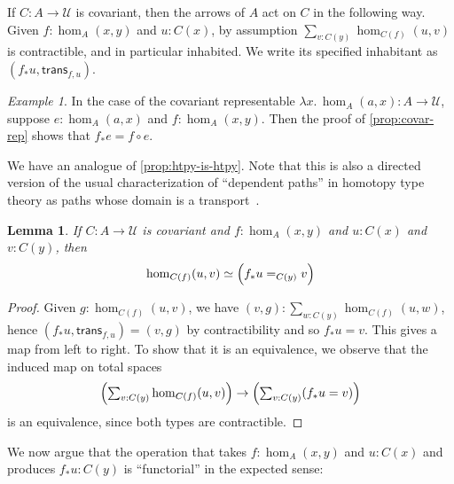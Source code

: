 \documentclass[12pt]{amsart}
\theoremstyle{plain}
\newtheorem{lem}[thm]{Lemma}
\theoremstyle{definition}
\theoremstyle{remark}
\newtheorem{ex}[thm]{Example}
\numberwithin{equation}{section}
\newcommand{\tsum}{\textstyle\sum}
\newcommand{\univtype}{\mathcal{U}}
\newcommand{\lam}[1]{\lambda #1.\,}
\newcommand{\covtr}[1]{{#1}_*}  %
\newcommand{\istrans}[2]{\mathsf{trans}_{#1,#2}}
\newcommand{\Parens}[1]{\Bigl(#1\Bigr)}
\begin{document}
If $C:A\to\univtype$ is covariant, then the arrows of $A$ act on $C$ in the following way.
Given $f:\hom_A(x,y)$ and $u:C(x)$, by assumption $\sum_{v:C(y)} \hom_{C(f)}(u,v)$ is contractible, and in particular inhabited.
We write its specified inhabitant as $(\covtr f u, \istrans f u)$.

\begin{ex}\label{ex:representable-transport}
  In the case of the covariant representable $\lam{x} \hom_A(a,x) : A\to \univtype$, suppose $e:\hom_A(a,x)$ and $f:\hom_A(x,y)$.
  Then the proof of \cref{prop:covar-rep} shows that $\covtr f e = f\circ e$.
\end{ex}

We have an analogue of \cref{prop:htpy-is-htpy}.
Note that this is also a directed version of the usual characterization of ``dependent paths'' in homotopy type theory as paths whose domain is a transport~\cite[(6.2.2)]{hottbook}.

\begin{lem}\label{thm:covtr-is-eq}
  If $C:A\to\univtype$ is covariant and $f:\hom_A(x,y)$ and $u:C(x)$ and $v:C(y)$, then
  \[ \hom_{C(f)}(u,v) \simeq \Parens{\covtr f u =_{C(y)} v} \]
\end{lem}
\begin{proof}
  Given $g:\hom_{C(f)}(u,v)$, we have $(v,g) : \sum_{w:C(y)}\hom_{C(f)}(u,w)$, hence $(\covtr f u,\istrans f u) = (v,g)$ by contractibility and so $\covtr f u = v$.
  This gives a map from left to right.
  To show that it is an equivalence, we observe that the induced map on total spaces
  \[ \Parens{\tsum_{v:C(y)} \hom_{C(f)}(u,v)} \to \Parens{\tsum_{v:C(y)}(\covtr f u = v)} \]
  is an equivalence, since both types are contractible.
\end{proof}

We now argue that the operation that takes $f:\hom_A(x,y)$ and $u:C(x)$ and produces $\covtr f u : C(y)$ is ``functorial'' in the expected sense:
\end{document}
